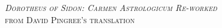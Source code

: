 \begin{titlingpage}
\centering
{\Huge\scshape \textsl{Dorotheus of Sidon: Carmen Astrologicum Re-worked}\\ [1in]}
{\small\scshape from David Pingree's translation} \\
\end{titlingpage}